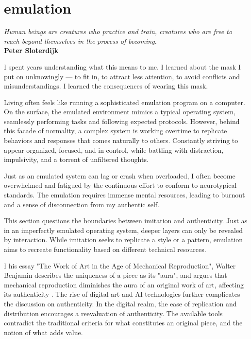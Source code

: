 \chapter*{emulation}
\begin{center}
\vspace{2cm}
\begin{flushright}
\large
\textit{ Human beings are creatures who practice and train, creatures who are free to reach beyond themselves in the process of becoming.}\\
\textbf{ Peter Sloterdijk } 
\citep{sloterdijk2014}
\end{flushright}
\vspace{2cm}
\end{center}
\normalsize

I spent years understanding what this means to me. I learned about the mask I put on unknowingly — to fit in, to attract less attention, to avoid conflicts and misunderstandings. I learned the consequences of wearing this mask. 

Living often feels like running a sophisticated emulation program on a computer. On the surface, the emulated environment mimics a typical operating system, seamlessly performing tasks and following expected protocols. However, behind this facade of normality, a complex system is working overtime to replicate behaviors and responses that comes naturally to others. Constantly striving to appear organized, focused, and in control, while battling with distraction, impulsivity, and a torrent of unfiltered thoughts.

Just as an emulated system can lag or crash when overloaded, I often become overwhelmed and fatigued by the continuous effort to conform to neurotypical standards. The emulation requires immense mental resources, leading to burnout and a sense of disconnection from my authentic self.

This section questions the boundaries between imitation and authenticity. Just as in an imperfectly emulated operating system, deeper layers can only be revealed by interaction. While imitation seeks to replicate a style or a pattern, emulation aims to recreate functionality based on different technical resources.

I his essay "The Work of Art in the Age of Mechanical Reproduction", Walter Benjamin describes the uniqueness of a piece as its "aura", and argues that mechanical reproduction diminishes the aura of an original work of art, affecting its authenticity \citep{benjamin1935}. The rise of digital art and  AI-technologies further complicates the discussion on authenticity. In the digital realm, the ease of replication and distribution encourages a reevaluation of authenticity. The available tools contradict the traditional criteria for what constitutes an original piece, and the notion of what adds value. 


